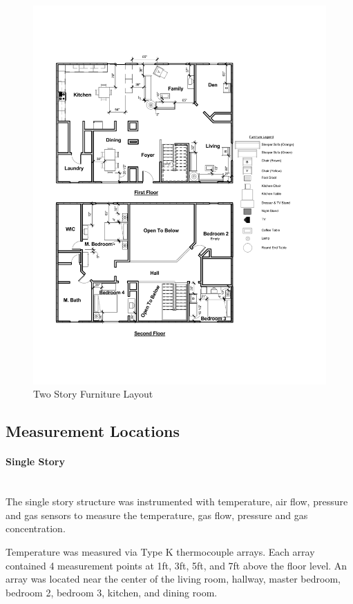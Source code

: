 \documentclass{article}
\begin{document}
\begin{figure}[H]
	\centering
	\includegraphics[width=\textwidth]{0_Images/Furniture/Two_Story_Furniture_Layout.pdf}
	\caption{Two Story Furniture Layout}
	\label{fig:TwoStoryFurniture}
\end{figure}

\subsection{Measurement Locations}

\paragraph{Single Story} \mbox{}\\
The single story structure was instrumented with temperature, air flow, pressure and gas sensors to measure the temperature, gas flow, pressure and gas concentration. 

Temperature was measured via Type K thermocouple arrays. Each array contained 4 measurement points at 1ft, 3ft, 5ft, and 7ft above the floor level. An array was located near the center of the living room, hallway, master bedroom, bedroom 2, bedroom 3, kitchen, and dining room.    
\end{document}
